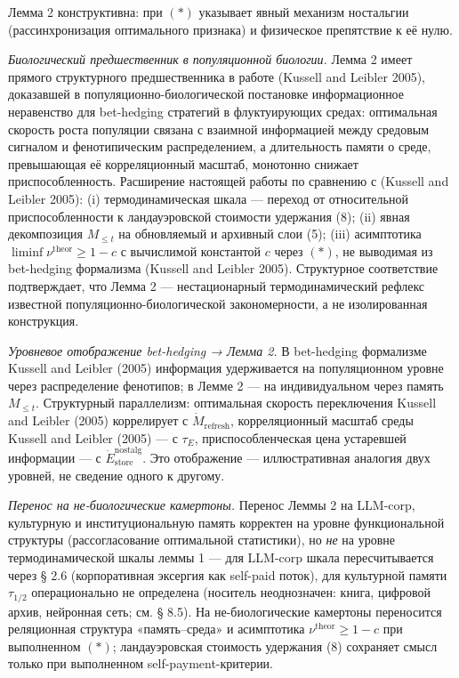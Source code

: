 \documentclass[pdflatex,sn-mathphys-ay]{sn-jnl}
\begin{document}
Лемма 2 конструктивна: при \((*)\) указывает явный механизм ностальгии (рассинхронизация оптимального признака) и физическое препятствие к её нулю.



\emph{Биологический предшественник в популяционной биологии.} Лемма 2 имеет прямого структурного предшественника в работе (Kussell and Leibler 2005), доказавшей в популяционно-биологической постановке информационное неравенство для bet-hedging стратегий в флуктуирующих средах: оптимальная скорость роста популяции связана с взаимной информацией между средовым сигналом и фенотипическим распределением, а длительность памяти о среде, превышающая её корреляционный масштаб, монотонно снижает приспособленность. Расширение настоящей работы по сравнению с (Kussell and Leibler 2005): (i) термодинамическая шкала --- переход от относительной приспособленности к ландауэровской стоимости удержания (8); (ii) явная декомпозиция \(M_{\le t}\) на обновляемый и архивный слои (5); (iii) асимптотика \(\liminf \nu^{\text{theor}} \ge 1 - c\) с вычислимой константой \(c\) через \((*)\), не выводимая из bet-hedging формализма (Kussell and Leibler 2005). Структурное соответствие подтверждает, что Лемма 2 --- нестационарный термодинамический рефлекс известной популяционно-биологической закономерности, а не изолированная конструкция.



\emph{Уровневое отображение bet-hedging → Лемма 2.} В bet-hedging формализме Kussell and Leibler (2005) информация удерживается на популяционном уровне через распределение фенотипов; в Лемме 2 --- на индивидуальном через память \(M_{\le t}\). Структурный параллелизм: оптимальная скорость переключения Kussell and Leibler (2005) коррелирует с \(\dot{M}_{\text{refresh}}\), корреляционный масштаб среды Kussell and Leibler (2005) --- с \(\tau_E\), приспособленческая цена устаревшей информации --- с \(\dot{E}_{\text{store}}^{\text{nostalg}}\). Это отображение --- иллюстративная аналогия двух уровней, не сведение одного к другому.



\emph{Перенос на не-биологические камертоны.} Перенос Леммы 2 на LLM-corp, культурную и институциональную память корректен на уровне функциональной структуры (рассогласование оптимальной статистики), но \emph{не} на уровне термодинамической шкалы леммы 1 --- для LLM-corp шкала пересчитывается через § 2.6 (корпоративная эксергия как self-paid поток), для культурной памяти \(\tau_{1/2}\) операционально не определена (носитель неоднозначен: книга, цифровой архив, нейронная сеть; см. § 8.5). На не-биологические камертоны переносится реляционная структура «память--среда» и асимптотика \(\nu^{\text{theor}} \ge 1-c\) при выполненном \((*)\); ландауэровская стоимость удержания (8) сохраняет смысл только при выполненном self-payment-критерии.
\end{document}
